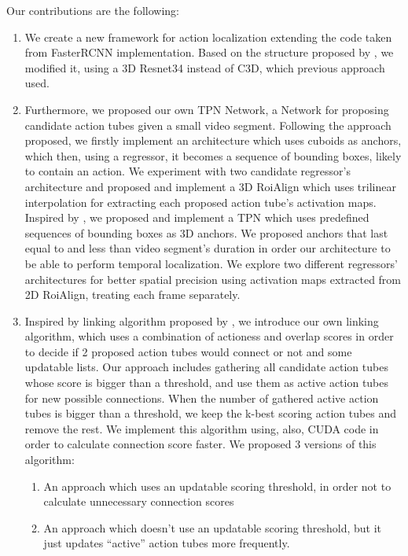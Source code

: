 Our contributions are the following:
\begin{enumerate}
\item We create a new framework for action localization extending the code taken from FasterRCNN implementation. Based on the structure
  proposed by \cite{DBLP:journals/corr/HouCS17}, we modified it, using a 3D Resnet34 instead of C3D, which previous approach used.

\item Furthermore, we proposed our own TPN Network, a Network for proposing candidate action tubes given a small video segment.
  Following the approach \cite{DBLP:journals/corr/HouCS17} proposed, we firstly implement an architecture which uses
  cuboids as anchors, which then, using a regressor, it becomes a sequence of bounding boxes, likely to contain an action.
  We experiment with two candidate regressor's architecture and proposed and implement a 3D RoiAlign which uses trilinear
  interpolation for extracting each proposed action tube's activation maps. 
  Inspired by \cite{DBLP:journals/corr/abs-1712-09184}, we proposed and implement a TPN which uses predefined sequences of bounding
  boxes as 3D anchors. We proposed anchors that last equal to and less than video segment's duration in order our architecture to be able to
  perform temporal localization. We explore two different regressors' architectures for better spatial precision using activation
  maps extracted from 2D RoiAlign, treating each frame separately.
\item Inspired by linking algorithm proposed by \cite{DBLP:journals/corr/HouCS17}, we introduce our own linking algorithm, which
  uses a combination of actioness and overlap scores in order to decide if 2 proposed action tubes would connect or not and some updatable lists.
  Our approach includes gathering all candidate action tubes whose score is bigger than a threshold, and use them as active action tubes for
  new possible connections. When the number of gathered active action tubes is bigger than a threshold, we keep the k-best scoring action tubes
  and remove the rest.  We implement this algorithm using, also, CUDA code in order to calculate connection score faster. We proposed 3 versions of this algorithm:
  \begin{enumerate}
  \item An approach which uses an updatable scoring threshold, in order not to calculate unnecessary connection scores
  \item An approach which doesn't use an updatable scoring threshold, but it just updates ``active'' action tubes more frequently.

\end{enumerate}
\end{enumerate}
